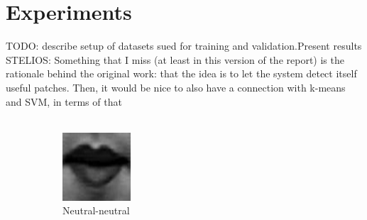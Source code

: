 \section{Experiments}
\nocite{Kanade2000CK+}\nocite{Lucey2010CK+}

TODO: describe setup of datasets sued for training and validation.Present results\\
STELIOS: Something that I miss (at least in this version of the report) is the rationale behind the original work: that the idea is to let the system detect itself useful patches. Then, it would be nice to also have a connection with k-means and SVM, in terms of that
\\
\\


\begin{figure}%
	\centering
	\begin{subfigure}[b]{0.15\textwidth}
		\includegraphics[width=\textwidth]{./img/timeseriesHappy/S026_006_00000001_conew1.png}
		\caption{Neutral-neutral}
		\label{fig:timeseriesHappy:a}
	\end{subfigure}
	\begin{subfigure}[b]{0.15\textwidth}

\end{subfigure}
\end{figure}
